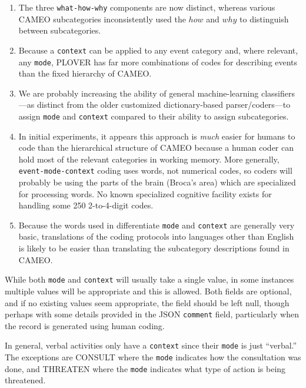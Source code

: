 \documentclass[11pt]{report}
\newcommand{\plcat}[1]{\textsf{#1}}
\newcommand{\txt}[1]{\texttt{#1}}
\begin{document}
\begin{enumerate}

\item The three \texttt{what-how-why} components are now distinct, whereas various CAMEO subcategories inconsistently used the $how$ and $why$ to distinguish between subcategories.

\item Because a \txt{context} can be applied to any event category and, where relevant, any \txt{mode}, PLOVER has far more combinations of codes for describing events than the fixed hierarchy of CAMEO.

\item We are probably increasing the ability of general machine-learning classifiers---as distinct from the older customized dictionary-based parser/coders---to assign \txt{mode} and \txt{context} compared to their ability to assign subcategories.

\item In initial experiments, it appears this  approach is \textit{much} easier for humans to code than the hierarchical structure of CAMEO because a human coder can hold most of the relevant categories in working memory. More generally,  \txt{event-mode-context}  coding uses words, not numerical codes, so coders will probably be using the parts of the brain (Broca's area) which are specialized for processing words. No known specialized cognitive facility exists for handling some 250 2-to-4-digit codes.

\item Because the words used in differentiate \txt{mode} and \txt{context} are generally very basic, translations of the coding protocols into languages other than English is likely to be easier than translating the subcategory descriptions found in CAMEO. 
\end{enumerate}

While both \txt{mode} and \txt{context} will usually take a single value, in some instances multiple values will be appropriate and this is allowed. Both fields are optional, and if no existing values seem appropriate, the field should be left null, though perhaps with some details provided in the JSON \texttt{comment} field, particularly when the record is generated using human coding.

In general, verbal activities only have a \txt{context} since their \txt{mode} is just ``verbal.'' The exceptions are \plcat{CONSULT} where the \texttt{mode} indicates how the consultation was done, and \plcat{THREATEN} where the \texttt{mode} indicates what type of action is being threatened. 
\end{document}
